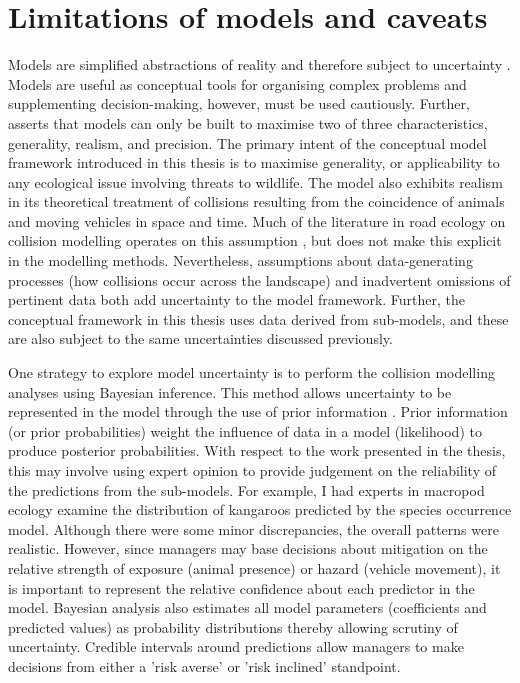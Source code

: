 \section{Limitations of models and caveats}

Models are simplified abstractions of reality and therefore subject to uncertainty \citep{burg05}. Models are useful as conceptual tools for organising complex problems and supplementing decision-making, however, must be used cautiously. Further, \cite{levi66} asserts that models can only be built to maximise two of three characteristics, generality, realism, and precision. The primary intent of the conceptual model framework introduced in this thesis is to maximise generality, or applicability to any ecological issue involving threats to wildlife. The model also exhibits realism in its theoretical treatment of collisions resulting from the coincidence of animals and moving vehicles in space and time. Much of the literature in road ecology on collision modelling operates on this assumption \citep{form03,guns11}, but does not make this explicit in the modelling methods. Nevertheless, assumptions about data-generating processes (how collisions occur across the landscape) and inadvertent omissions of pertinent data both add uncertainty to the model framework. Further, the conceptual framework in this thesis uses data derived from sub-models, and these are also subject to the same uncertainties discussed previously.  

One strategy to explore model uncertainty is to perform the collision modelling analyses using Bayesian inference. This method allows uncertainty to be represented in the model through the use of prior information \citep{}. Prior information (or prior probabilities) weight the influence of data in a model (likelihood) to produce posterior probabilities. With respect to the work presented in the thesis, this may involve using expert opinion to provide judgement on the reliability of the predictions from the sub-models. For example, I had experts in macropod ecology examine the distribution of kangaroos predicted by the species occurrence model. Although there were some minor discrepancies, the overall patterns were realistic. However, since managers may base decisions about mitigation on the relative strength of exposure (animal presence) or hazard (vehicle movement), it is important to represent the relative confidence about each predictor in the model. Bayesian analysis also estimates all model parameters (coefficients and predicted values) as probability distributions thereby allowing scrutiny of uncertainty. Credible intervals around predictions allow managers to make decisions from either a 'risk averse' or 'risk inclined' standpoint. 


